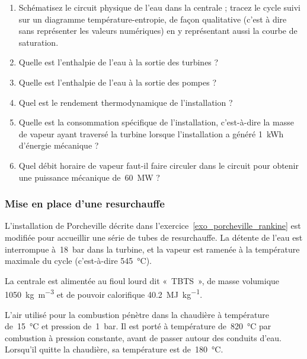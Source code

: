 	\begin{enumerate}
		\item Schématisez le circuit physique de l’eau dans la centrale ; tracez le cycle suivi sur un diagramme température-entropie, de façon qualitative (c’est à dire sans représenter les valeurs numériques) en y représentant aussi la courbe de saturation.
		\item Quelle est l’enthalpie de l’eau à la sortie des turbines ?
		\item Quelle est l’enthalpie de l’eau à la sortie des pompes ?
		\item	Quel est le rendement thermodynamique de l’installation ?
		\item Quelle est la consommation spécifique de l’installation, c’est-à-dire la masse de vapeur ayant traversé la turbine lorsque l’installation a généré \SI{1}{\kWh} d’énergie mécanique ?
		\item Quel débit horaire de vapeur faut-il faire circuler dans le circuit pour obtenir une puissance mécanique de~\SI{60}{\mega\watt} ?
	\end{enumerate}


\subsubsection{Mise en place d’une resurchauffe}
\label{exo_porcheville_resurchauffe}

	L’installation de Porcheville décrite dans l’exercice~\ref{exo_porcheville_rankine} est modifiée pour accueillir une série de tubes de resurchauffe. La détente de l’eau est interrompue à~\SI{18}{\bar} dans la turbine, et la vapeur est ramenée à la température maximale du cycle (c’est-à-dire \SI{545}{\degreeCelsius}).
	
	La centrale est alimentée au fioul lourd dit «~TBTS~», de masse volumique \SI{1050}{\kilogram\per\metre\cubed} et de pouvoir calorifique \SI{40,2}{\mega\joule\per\kilogram}.
	
	L’air utilisé pour la combustion pénètre dans la chaudière à température de~\SI{15}{\degreeCelsius} et pression de~\SI{1}{\bar}. Il est porté à température de~\SI{820}{\degreeCelsius} par combustion à pression constante, avant de passer autour des conduits d’eau. Lorsqu’il quitte la chaudière, sa température est de~\SI{180}{\degreeCelsius}.
	

